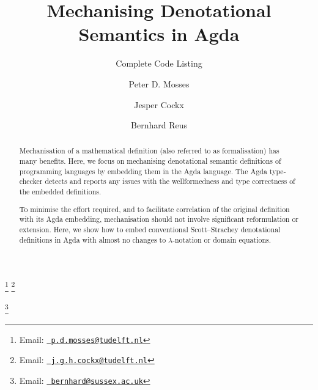 \documentclass[twoside,11pt]{entics}
\begin{document}
\begin{frontmatter}
  \title{Mechanising Denotational Semantics in Agda}
  \subtitle{Complete Code Listing}
  \author{Peter D. Mosses}	%
  \author{Jesper Cockx}		%
  \author{Bernhard Reus}		%
  \address[delft]{Department of Software Technology\\ Delft University of Technology\\	%
    Delft, Netherlands}  							
  \address[swansea]{Faculty of Science and Engineering\\ Swansea University\\
    Swansea, United Kingdom}  							
  \thanks[mosses]{Email: \href{mailto:p.d.mosses@tudelft.nl} {\texttt{\normalshape
      p.d.mosses@tudelft.nl}}} 
  \thanks[cockx]{Email: \href{mailto:j.g.h.cockx@tudelft.nl} {\texttt{\normalshape
      j.g.h.cockx@tudelft.nl}}} 
  \address[sussex]{School of Engineering and Informatics\\ University of Sussex\\
    Brighton, United Kingdom} 
  \thanks[reus]{Email:  \href{mailto:bernhard@sussex.ac.uk} {\texttt{\normalshape
        bernhard@sussex.ac.uk}}}

\begin{abstract} 
  Mechanisation of a mathematical definition (also referred to as formalisation)
  has many benefits. Here, we focus on mechanising denotational semantic definitions
  of programming languages by embedding them in the Agda language. The Agda
  type-checker detects and reports any issues with the wellformedness and type
  correctness of the embedded definitions.
  
  To minimise the effort required, and to facilitate correlation of the original
  definition with its Agda embedding, mechanisation should not involve significant
  reformulation or extension. Here, we show how  to embed conventional Scott–Strachey
  denotational definitions in Agda with almost no changes to $\lambda$-notation or
  domain equations.


\end{abstract}
\end{frontmatter}
\end{document}
